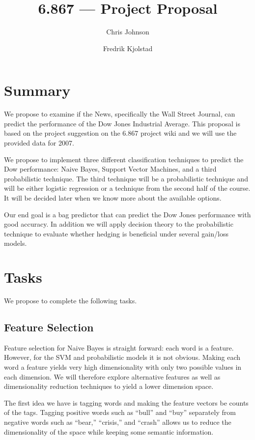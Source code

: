 \documentclass[10pt]{article}
\begin{document}
\title{6.867 --- Project Proposal}
\author{Chris Johnson \and Fredrik Kjolstad}
\date{}
\maketitle

\section{Summary}
We propose to examine if the News, specifically the Wall Street Journal, can predict the performance of the Dow Jones Industrial Average.
This proposal is based on the project suggestion on the 6.867 project wiki and we will use the provided data for 2007.

We propose to implement three different classification techniques to predict the Dow performance: Naive Bayes, Support Vector Machines, and a third probabilistic technique. The third technique will be a probabilistic technique and will be either logistic regression or a technique from the second half of the course.
It will be decided later when we know more about the available options.

Our end goal is a bag predictor that can predict the Dow Jones performance with good accuracy.
In addition we will apply decision theory to the probabilistic technique to evaluate whether hedging is beneficial under several gain/loss models.

\section{Tasks}
We propose to complete the following tasks.

\subsection{Feature Selection}
Feature selection for Naive Bayes is straight forward: each word is a feature.
However, for the SVM and probabilistic models it is not obvious.
Making each word a feature yields very high dimensionality with only two possible values in each dimension.
We will therefore explore alternative features as well as dimensionality reduction techniques to yield a lower dimension space.

The first idea we have is tagging words and making the feature vectors be counts of the tags. 
Tagging positive words such as ``bull'' and ``buy'' separately from negative words such as ``bear,'' ``crisis,'' and ``crash'' allows us to reduce the dimensionality of the space while keeping some semantic information.
\end{document}
